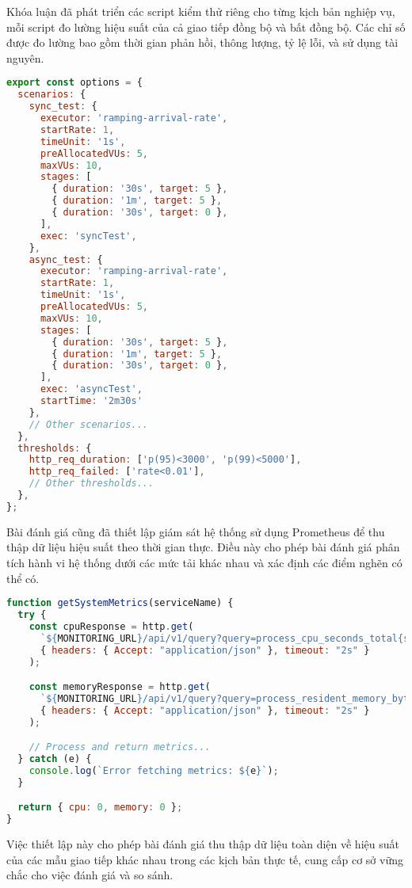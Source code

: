 Khóa luận đã phát triển các script kiểm thử riêng cho từng kịch bản nghiệp vụ, mỗi script đo lường hiệu suất của cả giao tiếp đồng bộ và bất đồng bộ. Các chỉ số được đo lường bao gồm thời gian phản hồi, thông lượng, tỷ lệ lỗi, và sử dụng tài nguyên.

\begin{lstlisting}[language=Javascript]
export const options = {
  scenarios: {
    sync_test: {
      executor: 'ramping-arrival-rate',
      startRate: 1,
      timeUnit: '1s',
      preAllocatedVUs: 5,
      maxVUs: 10,
      stages: [
        { duration: '30s', target: 5 },
        { duration: '1m', target: 5 },
        { duration: '30s', target: 0 },
      ],
      exec: 'syncTest',
    },
    async_test: {
      executor: 'ramping-arrival-rate',
      startRate: 1,
      timeUnit: '1s',
      preAllocatedVUs: 5,
      maxVUs: 10,
      stages: [
        { duration: '30s', target: 5 },
        { duration: '1m', target: 5 },
        { duration: '30s', target: 0 },
      ],
      exec: 'asyncTest',
      startTime: '2m30s'
    },
    // Other scenarios...
  },
  thresholds: {
    http_req_duration: ['p(95)<3000', 'p(99)<5000'],
    http_req_failed: ['rate<0.01'],
    // Other thresholds...
  },
};
\end{lstlisting}

Bài đánh giá cũng đã thiết lập giám sát hệ thống sử dụng Prometheus để thu thập dữ liệu hiệu suất theo thời gian thực. Điều này cho phép bài đánh giá phân tích hành vi hệ thống dưới các mức tải khác nhau và xác định các điểm nghẽn có thể có.

\begin{lstlisting}[language=Javascript]
function getSystemMetrics(serviceName) {
  try {
    const cpuResponse = http.get(
      `${MONITORING_URL}/api/v1/query?query=process_cpu_seconds_total{service="${serviceName}"}`,
      { headers: { Accept: "application/json" }, timeout: "2s" }
    );

    const memoryResponse = http.get(
      `${MONITORING_URL}/api/v1/query?query=process_resident_memory_bytes{service="${serviceName}"}`,
      { headers: { Accept: "application/json" }, timeout: "2s" }
    );

    // Process and return metrics...
  } catch (e) {
    console.log(`Error fetching metrics: ${e}`);
  }

  return { cpu: 0, memory: 0 };
}
\end{lstlisting}

Việc thiết lập này cho phép bài đánh giá thu thập dữ liệu toàn diện về hiệu suất của các mẫu giao tiếp khác nhau trong các kịch bản thực tế, cung cấp cơ sở vững chắc cho việc đánh giá và so sánh.
